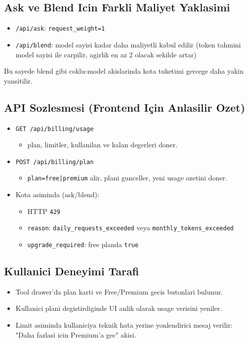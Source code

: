 \documentclass[12pt,a4paper]{article}
\begin{document}
\subsection{Ask ve Blend Icin Farkli Maliyet Yaklasimi}
\begin{itemize}[leftmargin=*]
  \item \texttt{/api/ask}: \texttt{request\_weight=1}
  \item \texttt{/api/blend}: model sayisi kadar daha maliyetli kabul edilir
  (token tahmini model sayisi ile carpilir, agirlik en az 2 olacak sekilde artar)
\end{itemize}

Bu sayede blend gibi coklu-model akislarinda kota tuketimi gercege daha yakin
yansitilir.

\subsection{API Sozlesmesi (Frontend Için Anlasilir Ozet)}
\begin{itemize}[leftmargin=*]
  \item \texttt{GET /api/billing/usage}
  \begin{itemize}[leftmargin=*]
    \item plan, limitler, kullanilan ve kalan degerleri doner.
  \end{itemize}
  \item \texttt{POST /api/billing/plan}
  \begin{itemize}[leftmargin=*]
    \item \texttt{plan=free|premium} alir, plani gunceller, yeni usage ozetini doner.
  \end{itemize}
  \item Kota asiminda (ask/blend):
  \begin{itemize}[leftmargin=*]
    \item HTTP \texttt{429}
    \item \texttt{reason}: \texttt{daily\_requests\_exceeded} veya \texttt{monthly\_tokens\_exceeded}
    \item \texttt{upgrade\_required}: free planda \texttt{true}
  \end{itemize}
\end{itemize}

\subsection{Kullanici Deneyimi Tarafi}
\begin{itemize}[leftmargin=*]
  \item Tool drawer'da plan karti ve Free/Premium gecis butonlari bulunur.
  \item Kullanici plani degistirdiginde UI anlik olarak usage verisini yeniler.
  \item Limit asiminda kullaniciya teknik hata yerine yonlendirici mesaj verilir:
  "Daha fazlasi icin Premium'a gec" akisi.
\end{itemize}
\end{document}
